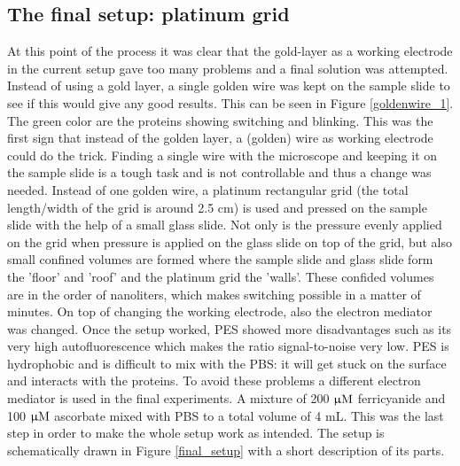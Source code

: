 \documentclass[twoside,single]{lion-msc}
\begin{document}
\subsection*{The final setup: platinum grid} \label{grid_1}
At this point of the process it was clear that the gold-layer as a working electrode in the current setup gave too many problems and a final solution was attempted. Instead of using a gold layer, a single golden wire was kept on the sample slide to see if this would give any good results. This can be seen in Figure \ref{goldenwire_1}. The green color are the proteins showing switching and blinking. This was the first sign that instead of the golden layer, a (golden) wire as working electrode could do the trick.  Finding a single wire with the microscope and keeping it on the sample slide is a tough task and is not controllable and thus a change was needed. Instead of one golden wire, a platinum rectangular grid (the total length/width of the grid is around 2.5 cm) is used and pressed on the sample slide with the help of a small glass slide. Not only is the pressure evenly applied on the grid when pressure is applied on the glass slide on top of the grid, but also small confined volumes are formed where the sample slide and glass slide form the 'floor' and 'roof' and the platinum grid the 'walls'. These confided volumes are in the order of nanoliters, which makes switching possible in a matter of minutes. On top of changing the working electrode, also the electron mediator was changed. Once the setup worked, PES showed more disadvantages such as its very high autofluorescence which makes the ratio signal-to-noise very low. PES is hydrophobic and is difficult to mix with the PBS: it will get stuck on the surface and interacts with the proteins. To avoid these problems a different electron mediator is used in the final experiments. A mixture of 200 $\upmu \textup{M}$ ferricyanide and 100 $\upmu \textup{M}$ ascorbate mixed with PBS to a total volume of 4 mL. This was the last step in order to make the whole setup work as intended. The setup is schematically drawn in Figure \ref{final_setup} with a short description of its parts.
\end{document}
